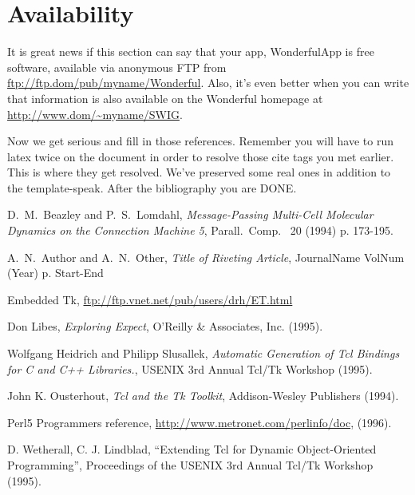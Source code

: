 \documentclass[XXX,endnotes]{usetex-v1}
\begin{document}
\section{Availability}

It is great news if this section can say that your
app, WonderfulApp is free
software, available via anonymous FTP from
\url{ftp://ftp.dom/pub/myname/Wonderful}.  Also, it's even better
when you can write that information is also available on the Wonderful
homepage at \url{http://www.dom/~myname/SWIG}.

Now we get serious and fill in those references.  Remember you will
have to run latex twice on the document in order to resolve those
cite tags you met earlier.  This is where they get resolved.
We've preserved some real ones in addition to the template-speak.
After the bibliography you are DONE.

\ifhasendnotes\makeendnotes\fi

\begin{thebibliography}{99}

 D.~M.~Beazley and P.~S.~Lomdahl, 
\emph{Message-Passing Multi-Cell Molecular Dynamics on the Connection
Machine 5}, Parall.~Comp.~ 20 (1994) p. 173-195.

 A.~N.~Author and A.~N.~Other, 
\emph{Title of Riveting Article}, JournalName VolNum (Year) p. Start-End

 Embedded Tk, \url{ftp://ftp.vnet.net/pub/users/drh/ET.html}

 Don Libes, \emph{Exploring Expect}, O'Reilly \& Associates, Inc. (1995).

 Wolfgang Heidrich and Philipp Slusallek, \emph{
Automatic Generation of Tcl Bindings for C and C++ Libraries.},
USENIX 3rd Annual Tcl/Tk Workshop (1995).

 John K. Ousterhout, \emph{Tcl and the Tk Toolkit}, Addison-Wesley Publishers (1994).

 Perl5 Programmers reference,
\url{http://www.metronet.com/perlinfo/doc}, (1996).

 D. Wetherall, C. J. Lindblad, ``Extending Tcl for
Dynamic Object-Oriented Programming'', Proceedings of the USENIX 3rd Annual Tcl/Tk Workshop (1995).

\end{thebibliography}
\end{document}
